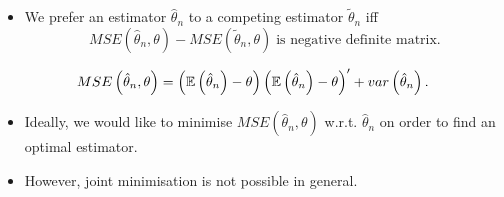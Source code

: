 \documentclass[notes=show]{beamer}
\begin{document}
\begin{frame}%


\begin{itemize}
\item We prefer an estimator $\hat{\theta}_{n}$ to a competing estimator $%
\tilde{\theta}_{n}$ iff%
\begin{equation*}
MSE\left( \hat{\theta}_{n},\theta \right) -MSE\left( \tilde{\theta}%
_{n},\theta \right) \;\text{is negative definite matrix.}
\end{equation*}
\end{itemize}

\begin{definition}
\begin{equation*}
MSE\left( \hat{\theta}_{n},\theta \right) =\left( \mathbb{E}\left( \hat{%
\theta}_{n}\right) -\theta \right) \left( \mathbb{E}\left( \hat{\theta}%
_{n}\right) -\theta \right) ^{\prime }+var\left( \hat{\theta}_{n}\right) .
\end{equation*}
\end{definition}

\begin{itemize}
\item Ideally, we would like to minimise $MSE\left( \hat{\theta}_{n},\theta
\right) $ w.r.t. $\hat{\theta}_{n}$ on order to find an optimal estimator.

\item However, joint minimisation is not possible in general.
\end{itemize}

\end{frame}%
\end{document}
